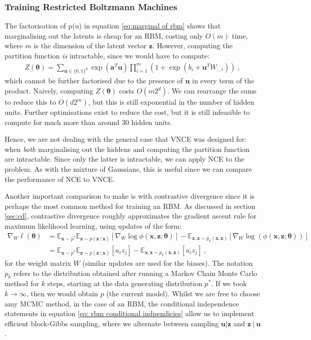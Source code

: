 \documentclass[11pt, oneside]{article}
\newcommand{\thetab}{{\boldsymbol{\theta}}}
\newcommand{\pnn}{\phi}
\renewcommand{\u}{{\mathbf u}}
\newcommand{\x}{{\mathbf x}}
\newcommand{\z}{{\mathbf z}}
\newcommand{\E}{\mathbb{E}}
\newcommand{\Edata}{\E_{\x \sim p^*}}
\newcommand\given[1][]{\:#1\vert\:}
\theoremstyle{definition}
\begin{document}
\subsubsection{Training Restricted Boltzmann Machines}
\label{sec:training_rbms}

The factorisation of p(\u) in equation \ref{eq:marginal of rbm} shows that marginalising out the latents is cheap for an RBM, costing only $O(m)$ time, where $m$ is the dimension of the latent vector $\z$. However, computing the partition function \emph{is} intractable, since we would have to compute:
\begin{align}
    Z(\thetab) = \sum_{\u \in \{0, 1\}^d} \exp(\textbf{a}^T\u) \prod_{i=1}^m (1 + \exp(b_i + \u^T W_{:, i})) \ ,
\end{align}
which cannot be further factorised due to the presence of $\u$ in every term of the product. Naively, computing $Z(\thetab)$ costs $O(m2^d)$. We can rearrange the sums to reduce this to $O(d2^m)$, but this is still exponential in the number of hidden units. Further optimisations exist to reduce the cost, but it is still infeasible to compute for much more than around 30 hidden units. 

Hence, we are not dealing with the general case that VNCE was designed for: when \emph{both} marginalising out the hiddens and computing the partition function are intractable. Since only the latter is intractable, we can apply NCE to the problem. As with the mixture of Gaussians, this is useful since we can compare the performance of NCE to VNCE.

Another important comparison to make is with contrastive divergence since it is perhaps the most common method for training an RBM. As discussed in section \ref{sec:cd}, contrastive divergence roughly approximates the gradient ascent rule for maximum likelihood learning, using updates of the form:
\begin{align}
    \label{eq:cd grad update for rbm}
    \nabla_{W} \ell(\thetab) &= \Edata \E_{\z \sim p(\z \given \x)} \left[ \nabla_{W} \log \pnn(\x, \z;\thetab) \right] - \E_{\x, \z \sim p_k(\x, \z)} \left[\nabla_{W} \log \left(\pnn(\x, \z;\thetab) \right) \right] \\
                      &= \Edata \E_{\z \sim p(\z \given \x)} \left[ u_i z_j \right] - \E_{\x, \z \sim p_k(\x, \z)} \left[ u_i z_j \right] \ ,
\end{align}
for the weight matrix $W$ (similar updates are used for the biases). The notation $p_k$ refers to the distribution obtained after running a Markov Chain Monte Carlo method for $k$ steps, starting at the data generating distribution $p^*$. If we took $k \rightarrow \infty$, then we would obtain $p$ (the current model). Whilst we are free to choose amy MCMC method, in the case of an RBM, the conditional independence statements in equation \ref{eq: rbm conditional indpendicies} allow us to implement efficient block-Gibbs sampling, where we alternate between sampling $\u | \z$ and $\z \given \u$.
\end{document}
